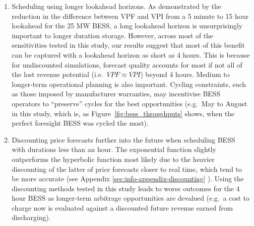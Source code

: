 \documentclass[12pt,a4paper,]{report}
\begin{document}
\begin{enumerate}
\def\labelenumi{\arabic{enumi}.}
\item
  Scheduling using longer lookahead horizons. As demonstrated by the
  reduction in the difference between VPF and VPI from a 5 minute to 15
  hour lookahead for the 25 MW BESS, a long lookahead horizon is
  unsurprisingly important to longer duration storage. However, across
  most of the sensitivities tested in this study, our results suggest
  that most of this benefit can be captured with a lookahead horizon as
  short as 4 hours. This is because for undiscounted simulations,
  forecast quality accounts for most if not all of the lost revenue
  potential (i.e.~\(VPF \approx VPI\)) beyond 4 hours. Medium to
  longer-term operational planning is also important. Cycling
  constraints, such as those imposed by manufacturer warranties, may
  incentivise BESS operators to ``preserve'' cycles for the best
  opportunities (e.g.~May to August in this study, which is, as
  Figure~\ref{fig:bess_throughputs} shows, when the perfect foresight
  BESS was cycled the most).
\item
  Discounting price forecasts further into the future when scheduling
  BESS with durations less than an hour. The exponential function
  slightly outperforms the hyperbolic function most likely due to the
  heavier discounting of the latter of price forecasts closer to real
  time, which tend to be more accurate (see Appendix
  \ref{sec:info-appendix-discounting} ). Using the discounting methods
  tested in this study leads to worse outcomes for the 4 hour BESS as
  longer-term arbitrage opportunities are devalued (e.g.~a cost to
  charge now is evaluated against a discounted future revenue earned
  from discharging).
\end{enumerate}
\end{document}
